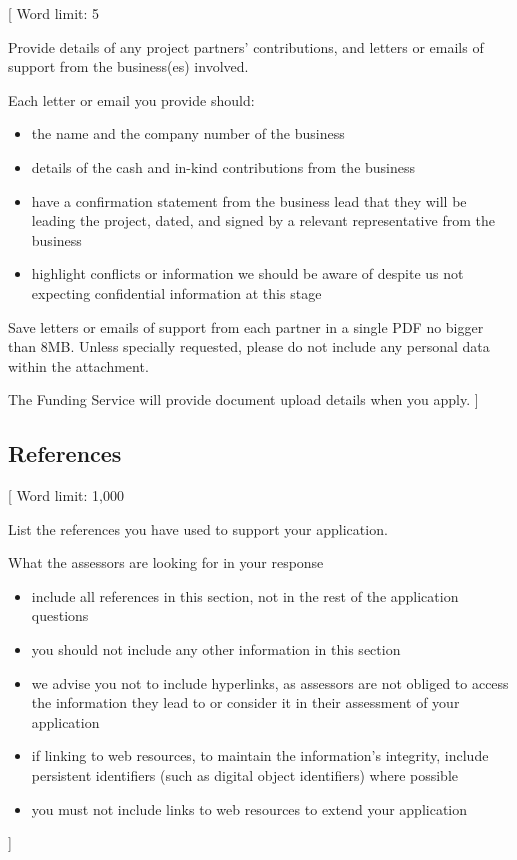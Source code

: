 \documentclass{article}
\newcommand{\desc}[1]{{\leavevmode\color{blue}[#1]}}
\begin{document}
\desc{
Word limit: 5

Provide details of any project partners’ contributions, and letters or emails
of support from the business(es) involved.

Each letter or email you provide should:

\begin{itemize}

    \item the name and the company number of the business

    \item details of the cash and in-kind contributions from the business

    \item have a confirmation statement from the business lead that they will
        be leading the project, dated, and signed by a relevant representative
        from the business

    \item highlight conflicts or information we should be aware of despite us
        not expecting confidential information at this stage

\end{itemize}

Save letters or emails of support from each partner in a single PDF no bigger
than 8MB. Unless specially requested, please do not include any personal data
within the attachment.

The Funding Service will provide document upload details when you apply.
}

\subsection{References}

\desc{
Word limit: 1,000

List the references you have used to support your application.

What the assessors are looking for in your response

\begin{itemize}

    \item include all references in this section, not in the rest of the
        application questions

    \item you should not include any other information in this section

    \item we advise you not to include hyperlinks, as assessors are not obliged
        to access the information they lead to or consider it in their
        assessment of your application

    \item if linking to web resources, to maintain the information’s integrity,
        include persistent identifiers (such as digital object identifiers)
        where possible

    \item you must not include links to web resources to extend your
        application

\end{itemize}
}
\end{document}
